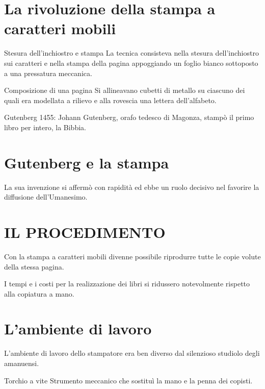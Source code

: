 \documentclass[12pt]{article}
\begin{document}
\section{La rivoluzione della stampa a caratteri mobili}


\begin{defn}{Stesura dell'inchiostro e stampa}
La tecnica consisteva nella stesura dell'inchiostro sui caratteri e nella stampa della pagina appoggiando un foglio bianco sottoposto a una pressatura meccanica.
\end{defn}


\begin{defn}{Composizione di una pagina}
Si allineavano cubetti di metallo su ciascuno dei quali era modellata a rilievo e alla rovescia una lettera dell'alfabeto.
\end{defn}


\begin{defn}{Gutenberg}
1455: Johann Gutenberg, orafo tedesco di Magonza, stampò il primo libro per intero, la Bibbia.
\end{defn}


\section{Gutenberg e la stampa}


La sua invenzione si affermò con rapidità ed ebbe un ruolo decisivo nel favorire la diffusione dell'Umanesimo.


\section{IL PROCEDIMENTO}


Con la stampa a caratteri mobili divenne possibile riprodurre tutte le copie volute della stessa pagina.


I tempi e i costi per la realizzazione dei libri si ridussero notevolmente rispetto alla copiatura a mano.


\section{L'ambiente di lavoro}


L'ambiente di lavoro dello stampatore era ben diverso dal silenzioso studiolo degli amanuensi.


\begin{defn}{Torchio a vite}
Strumento meccanico che sostituì la mano e la penna dei copisti.
\end{defn}
\end{document}
